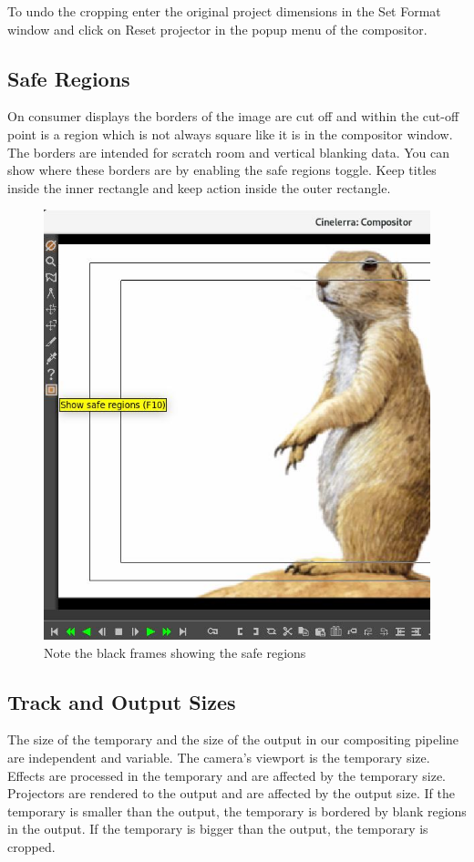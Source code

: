 To undo the cropping enter the original project dimensions in the Set Format window and click on Reset projector in the popup menu of the compositor.

\subsection{Safe Regions}%
\label{sub:safe_regions}

On consumer displays the borders of the image are cut off and within the cut-off point is a region which is not always square like it is in the compositor window. 
The borders are intended for scratch room and vertical blanking data. 
You can show where these borders are by enabling the safe regions toggle. 
Keep titles inside the inner rectangle and keep action inside the outer rectangle.

\begin{figure}[htpb]
    \centering
    \includegraphics[width=0.6\linewidth]{images/safe_regions.png}
    \caption{Note the black frames showing the safe regions}
    \label{fig:safe_regions}
\end{figure}

\subsection{Track and Output Sizes}%
\label{sub:track_and_output_sizes}


The size of the temporary and the size of the output in our compositing pipeline are independent and variable. 
The camera's viewport is the temporary size. 
Effects are processed in the temporary and are affected by the temporary size. 
Projectors are rendered to the output and are affected by the output size. 
If the temporary is smaller than the output, the temporary is bordered by blank regions in the output. 
If the temporary is bigger than the output, the temporary is cropped.

